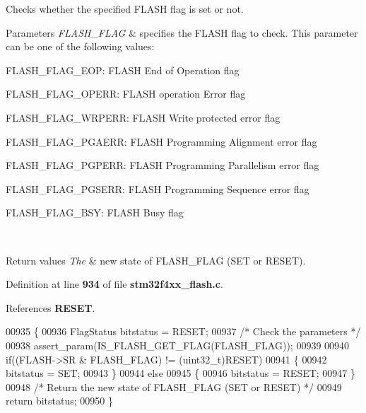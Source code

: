 Checks whether the specified F\+L\+A\+SH flag is set or not. 


\begin{DoxyParams}{Parameters}
{\em F\+L\+A\+S\+H\+\_\+\+F\+L\+AG} & specifies the F\+L\+A\+SH flag to check. This parameter can be one of the following values\+: \begin{DoxyItemize}
\item F\+L\+A\+S\+H\+\_\+\+F\+L\+A\+G\+\_\+\+E\+OP\+: F\+L\+A\+SH End of Operation flag \item F\+L\+A\+S\+H\+\_\+\+F\+L\+A\+G\+\_\+\+O\+P\+E\+RR\+: F\+L\+A\+SH operation Error flag \item F\+L\+A\+S\+H\+\_\+\+F\+L\+A\+G\+\_\+\+W\+R\+P\+E\+RR\+: F\+L\+A\+SH Write protected error flag \item F\+L\+A\+S\+H\+\_\+\+F\+L\+A\+G\+\_\+\+P\+G\+A\+E\+RR\+: F\+L\+A\+SH Programming Alignment error flag \item F\+L\+A\+S\+H\+\_\+\+F\+L\+A\+G\+\_\+\+P\+G\+P\+E\+RR\+: F\+L\+A\+SH Programming Parallelism error flag \item F\+L\+A\+S\+H\+\_\+\+F\+L\+A\+G\+\_\+\+P\+G\+S\+E\+RR\+: F\+L\+A\+SH Programming Sequence error flag \item F\+L\+A\+S\+H\+\_\+\+F\+L\+A\+G\+\_\+\+B\+SY\+: F\+L\+A\+SH Busy flag \end{DoxyItemize}
\\
\hline
\end{DoxyParams}

\begin{DoxyRetVals}{Return values}
{\em The} & new state of F\+L\+A\+S\+H\+\_\+\+F\+L\+AG (S\+ET or R\+E\+S\+ET). \\
\hline
\end{DoxyRetVals}


Definition at line \textbf{ 934} of file \textbf{ stm32f4xx\+\_\+flash.\+c}.



References \textbf{ R\+E\+S\+ET}.


\begin{DoxyCode}
00935 \{
00936   FlagStatus bitstatus = RESET;
00937   \textcolor{comment}{/* Check the parameters */}
00938   assert_param(IS_FLASH_GET_FLAG(FLASH\_FLAG));
00939 
00940   \textcolor{keywordflow}{if}((FLASH->SR & FLASH\_FLAG) != (uint32\_t)RESET)
00941   \{
00942     bitstatus = SET;
00943   \}
00944   \textcolor{keywordflow}{else}
00945   \{
00946     bitstatus = RESET;
00947   \}
00948   \textcolor{comment}{/* Return the new state of FLASH\_FLAG (SET or RESET) */}
00949   \textcolor{keywordflow}{return} bitstatus; 
00950 \}
\end{DoxyCode}
\mbox{\label{group__FLASH_gac265b8d1e7ea11e44ceee28797c3debb}} 
